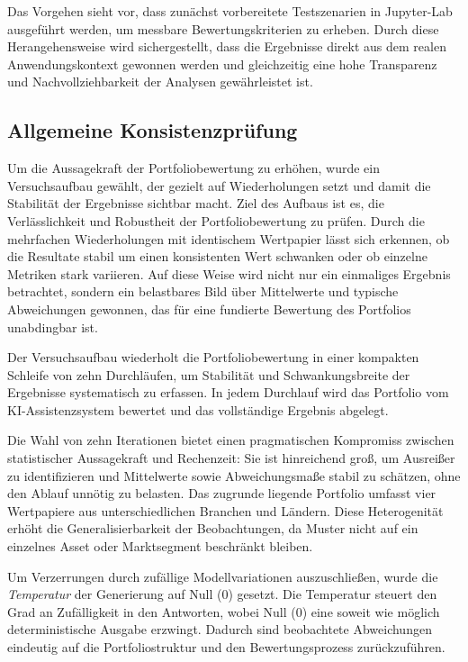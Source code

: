     Das Vorgehen sieht vor, dass zunächst vorbereitete Testszenarien in Jupyter-Lab ausgeführt werden, um messbare Bewertungskriterien zu erheben.
    Durch diese Herangehensweise wird sichergestellt, dass die Ergebnisse direkt aus dem realen Anwendungskontext gewonnen werden und gleichzeitig eine hohe Transparenz und Nachvollziehbarkeit der Analysen gewährleistet ist.


    \subsection{Allgemeine Konsistenzprüfung}
      \label{sec:konsistenz_doing}

      Um die Aussagekraft der Portfoliobewertung zu erhöhen, wurde ein Versuchsaufbau gewählt, der gezielt auf Wiederholungen setzt und damit die Stabilität der Ergebnisse sichtbar macht.
      Ziel des Aufbaus ist es, die Verlässlichkeit und Robustheit der Portfoliobewertung zu prüfen.
      Durch die mehrfachen Wiederholungen mit identischem Wertpapier lässt sich erkennen, ob die Resultate stabil um einen konsistenten Wert schwanken oder ob einzelne Metriken stark variieren.
      Auf diese Weise wird nicht nur ein einmaliges Ergebnis betrachtet, sondern ein belastbares Bild über Mittelwerte und typische Abweichungen gewonnen, das für eine fundierte Bewertung des Portfolios unabdingbar ist.

      Der Versuchsaufbau wiederholt die Portfoliobewertung in einer kompakten Schleife von zehn Durchläufen, um Stabilität und Schwankungsbreite der Ergebnisse systematisch zu erfassen.
      In jedem Durchlauf wird das Portfolio vom KI-Assistenzsystem bewertet und das vollständige Ergebnis abgelegt.

      Die Wahl von zehn Iterationen bietet einen pragmatischen Kompromiss zwischen statistischer Aussagekraft und Rechenzeit:
      Sie ist hinreichend groß, um Ausreißer zu identifizieren und Mittelwerte sowie Abweichungsmaße stabil zu schätzen, ohne den Ablauf unnötig zu belasten.
      Das zugrunde liegende Portfolio umfasst vier Wertpapiere aus unterschiedlichen Branchen und Ländern.
      Diese Heterogenität erhöht die Generalisierbarkeit der Beobachtungen, da Muster nicht auf ein einzelnes Asset oder Marktsegment beschränkt bleiben.

      Um Verzerrungen durch zufällige Modellvariationen auszuschließen, wurde die \emph{Temperatur} der Generierung auf Null (0) gesetzt.
      Die Temperatur steuert den Grad an Zufälligkeit in den Antworten, wobei Null (0) eine soweit wie möglich deterministische Ausgabe erzwingt.
      Dadurch sind beobachtete Abweichungen eindeutig auf die Portfoliostruktur und den Bewertungsprozess zurückzuführen.

